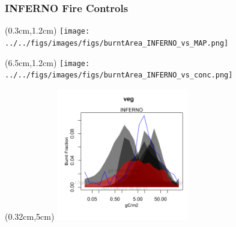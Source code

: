 \begin{frame}
	\frametitle{INFERNO Fire Controls}
	\begin{textblock*}{14cm}(0.3cm,1.2cm)
		\texttt{[image: ../../figs/images/figs/burntArea\_INFERNO\_vs\_MAP.png]}	
	\end{textblock*}
	\begin{textblock*}{14cm}(6.5cm,1.2cm)
		\texttt{[image: ../../figs/images/figs/burntArea\_INFERNO\_vs\_conc.png]}	
	\end{textblock*}
	\begin{textblock*}{14cm}(0.32cm,5cm)
		\includegraphics[width=5.78cm]{../../figs/burntArea_INFERNO_vs_veg.png}		
	\end{textblock*}
\end{frame}


